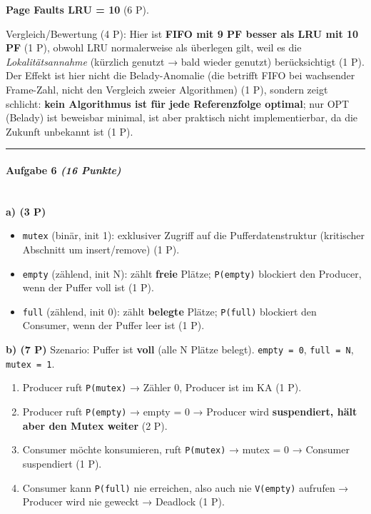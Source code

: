 \documentclass[11pt, a4paper]{article}
\begin{document}
\textbf{Page Faults LRU = 10} (6 P).


Vergleich/Bewertung (4 P): Hier ist \textbf{FIFO mit 9 PF besser als LRU mit 10 PF} (1 P), obwohl LRU normalerweise als überlegen gilt, weil es die \textit{Lokalitätsannahme} (kürzlich genutzt → bald wieder genutzt) berücksichtigt (1 P). Der Effekt ist hier nicht die Belady-Anomalie (die betrifft FIFO bei wachsender Frame-Zahl, nicht den Vergleich zweier Algorithmen) (1 P), sondern zeigt schlicht: \textbf{kein Algorithmus ist für jede Referenzfolge optimal}; nur OPT (Belady) ist beweisbar minimal, ist aber praktisch nicht implementierbar, da die Zukunft unbekannt ist (1 P).



\noindent\textcolor{rulegray}{\rule{\linewidth}{0.4pt}}


\paragraph{Aufgabe 6 \textit{(16 Punkte)}}\mbox{}\\[2pt]

\textbf{a) (3 P)}

\begin{itemize}
  \item \texttt{mutex} (binär, init 1): exklusiver Zugriff auf die Pufferdatenstruktur (kritischer Abschnitt um insert/remove) (1 P).
  \item \texttt{empty} (zählend, init N): zählt \textbf{freie} Plätze; \texttt{P(empty)} blockiert den Producer, wenn der Puffer voll ist (1 P).
  \item \texttt{full} (zählend, init 0): zählt \textbf{belegte} Plätze; \texttt{P(full)} blockiert den Consumer, wenn der Puffer leer ist (1 P).
\end{itemize}

\textbf{b) (7 P)} Szenario: Puffer ist \textbf{voll} (alle N Plätze belegt). \texttt{empty = 0}, \texttt{full = N}, \texttt{mutex = 1}.

\begin{enumerate}
  \item Producer ruft \texttt{P(mutex)} → Zähler 0, Producer ist im KA (1 P).
  \item Producer ruft \texttt{P(empty)} → empty = 0 → Producer wird \textbf{suspendiert, hält aber den Mutex weiter} (2 P).
  \item Consumer möchte konsumieren, ruft \texttt{P(mutex)} → mutex = 0 → Consumer suspendiert (1 P).
  \item Consumer kann \texttt{P(full)} nie erreichen, also auch nie \texttt{V(empty)} aufrufen → Producer wird nie geweckt → Deadlock (1 P).
\end{enumerate}
\end{document}
